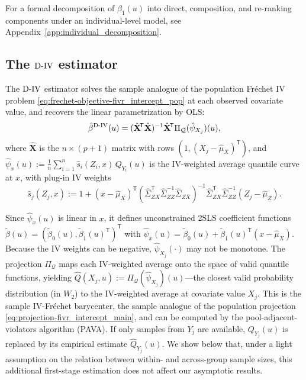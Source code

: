 \documentclass[12pt]{article}
\newcommand{\T}{\mathsf{T}} %
\newcommand{\est}{\ensuremath{\textnormal{D-IV}}\xspace}
\begin{document}
For a formal decomposition of $\beta_1(u)$ into direct, composition, and re-ranking components under an individual-level model, see Appendix~\ref{app:individual_decomposition}.

\subsection{The \est estimator}\label{sec:div_estimator}

The \est estimator solves the sample analogue of the population Fr\'echet IV problem \eqref{eq:frechet-objective-fivr_intercept_pop} at each observed covariate value, and recovers the linear parametrization by OLS:
\begin{equation}\label{eq:div_estimator}
\hat{\beta}^{\est}(u) = (\hat{\mathbf{X}}^{\!\T}\hat{\mathbf{X}})^{-1}\hat{\mathbf{X}}^{\!\T} \Pi_{\mathcal{Q}}(\hat{\psi}_{X_j})(u),
\end{equation}
where $\hat{\mathbf{X}}$ is the $n \times (p+1)$ matrix with rows $(1, (X_j - \hat{\mu}_X)^{\!\T})$, and $\hat{\psi}_x(u) := \frac{1}{n}\sum_{i=1}^n \hat{s}_i(Z_i, x)\, Q_{Y_i}(u)$ is the IV-weighted average quantile curve at $x$, with plug-in IV weights
$$
\hat{s}_{j}(Z_j,x) := 1 + (x-\hat{\mu}_X)^{\!\T} (\hat{\Sigma}_{ZX}^{\!\T}\hat{\Sigma}_{ZZ}^{-1}\hat{\Sigma}_{ZX})^{-1} \hat{\Sigma}_{ZX}^{\!\T}\hat{\Sigma}_{ZZ}^{-1} (Z_j-\hat{\mu}_Z).
$$

Since $\hat{\psi}_x(u)$ is linear in $x$, it defines unconstrained 2SLS coefficient functions $\tilde{\beta}(u) = (\tilde{\beta}_0(u), \tilde{\beta}_1(u)^{\!\T})^{\!\T}$ with $\hat{\psi}_x(u) = \tilde{\beta}_0(u) + \tilde{\beta}_1(u)^{\!\T}(x - \hat{\mu}_X)$. Because the IV weights can be negative, $\hat{\psi}_{X_j}(\cdot)$ may not be monotone. The projection $\Pi_{\mathcal{Q}}$ maps each IV-weighted average onto the space of valid quantile functions, yielding $\hat{Q}(X_j, u) := \Pi_{\mathcal{Q}}(\hat{\psi}_{X_j})(u)$---the closest valid probability distribution (in $W_2$) to the IV-weighted average at covariate value $X_j$. This is the sample IV-Fr\'echet barycenter, the sample analogue of the population projection \eqref{eq:projection-fivr_intercept_main}, and can be computed by the pool-adjacent-violators algorithm (PAVA). If only samples from $Y_j$ are available, $Q_{Y_j}(u)$ is replaced by its empirical estimate $\widehat{Q}_{Y_j}(u)$. We show below that, under a light assumption on the relation between within- and across-group sample sizes, this additional first-stage estimation does not affect our asymptotic results.
\end{document}
